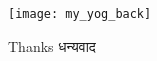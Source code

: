 \begin{frame}[fragile]\frametitle{}

\begin{center}
\texttt{[image: my\_yog\_back]}

Thanks धन्यवाद
\end{center}

\end{frame}
